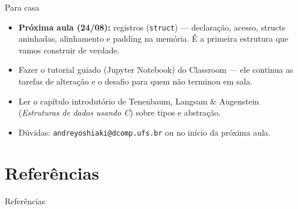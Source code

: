 \documentclass[aspectratio=169]{beamer}
\begin{document}
\begin{frame}{Para casa}
  \begin{itemize}
    \item \textbf{Próxima aula (24/08):} registros (\texttt{struct}) ---
      declaração, acesso, structs aninhadas, alinhamento e padding na
      memória. É a primeira estrutura que vamos construir de verdade.
    \item Fazer o tutorial guiado (Jupyter Notebook) do Classroom --- ele
      continua as tarefas de alteração e o desafio para quem não terminou em
      sala.
    \item Ler o capítulo introdutório de Tenenbaum, Langsam \& Augenstein
      (\emph{Estruturas de dados usando C}) sobre tipos e abstração.
    \item Dúvidas: \texttt{andreyoshiaki@dcomp.ufs.br} ou no início da
      próxima aula.
  \end{itemize}
\end{frame}

\section*{Referências}
\begin{frame}[allowframebreaks]{Referências}
  \footnotesize
  \nocite{*}
  
  
\end{frame}
\end{document}
